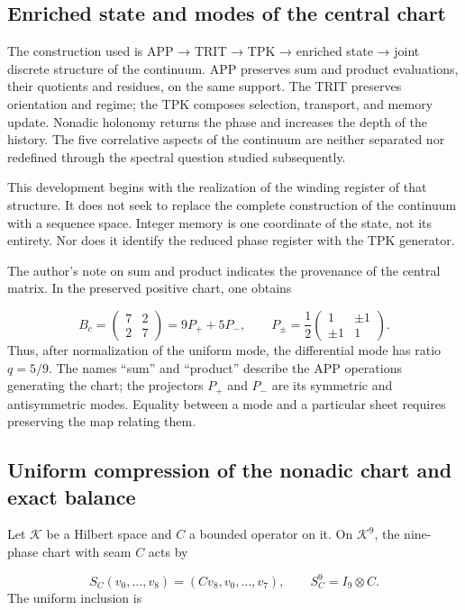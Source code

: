 \subsection{Enriched state and modes of the central chart}
\label{tm-add-c1}
The construction used is APP → TRIT → TPK → enriched state → joint discrete structure of the continuum. APP preserves sum and product evaluations, their quotients and residues, on the same support. The TRIT preserves orientation and regime; the TPK composes selection, transport, and memory update. Nonadic holonomy returns the phase and increases the depth of the history. The five correlative aspects of the continuum are neither separated nor redefined through the spectral question studied subsequently.

This development begins with the realization of the winding register of that structure. It does not seek to replace the complete construction of the continuum with a sequence space. Integer memory is one coordinate of the state, not its entirety. Nor does it identify the reduced phase register with the TPK generator.

The author's note on sum and product indicates the provenance of the central matrix. In the preserved positive chart, one obtains

\[
B_c=\begin{pmatrix}7&2\\2&7\end{pmatrix}
=9P_++5P_-,\qquad
P_\pm=\frac12\begin{pmatrix}1&\pm1\\\pm1&1\end{pmatrix}.
\]
Thus, after normalization of the uniform mode, the differential mode has ratio \(q=5/9\). The names “sum” and “product” describe the APP operations generating the chart; the projectors \(P_+\) and \(P_-\) are its symmetric and antisymmetric modes. Equality between a mode and a particular sheet requires preserving the map relating them.


\subsection{Uniform compression of the nonadic chart and exact balance}
\label{tm-add-c2}
Let \(\mathcal K\) be a Hilbert space and \(C\) a bounded operator on it. On \(\mathcal K^9\), the nine-phase chart with seam \(C\) acts by

\[
S_C(v_0,\ldots,v_8)=(Cv_8,v_0,\ldots,v_7),
\qquad S_C^9=I_9\otimes C.
\]
The uniform inclusion is

